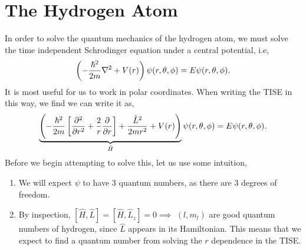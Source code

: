 \documentclass{book}
\begin{document}
\chapter{The Hydrogen Atom}
In order to solve the quantum mechanics of the hydrogen atom, we must solve the time independent Schrodinger equation under a central potential, i.e,
\begin{equation}
	\left(-\frac{\hbar^2}{2m}\laplacian + V(r)\right)\psi(r, \theta, \phi) = E \psi(r, \theta, \phi).
\end{equation} 
It is most useful for us to work in polar coordinates. When writing the TISE in this way, we find we can write it as,
\begin{equation}
	\underbrace{\left(-\frac{\hbar^2}{2m}\left[\pdv[2]{r} + \frac{2}{r}\pdv{r}\right] + \frac{\hat{L}^2}{2mr^2}+V(r)\right)}_{\hat{H}}\psi(r,\theta,\phi) = E\psi(r,\theta,\phi). \label{eq:hyd}
\end{equation}
Before we begin attempting to solve this, let us use some intuition,
\begin{enumerate}
	\item We will expect $\psi$ to have 3 quantum numbers, as there are 3 degrees of freedom.
	\item By inspection, $\left[\hat{H},\hat{L}\right] = \left[\hat{H},\hat{L}_z\right] = 0 \implies$ $(l,m_l)$ are good quantum numbers of hydrogen, since $\hat{L}$ appears in its Hamiltonian. This means that we expect to find a quantum number from solving the $r$ dependence in the TISE.
\end{enumerate}
\end{document}
